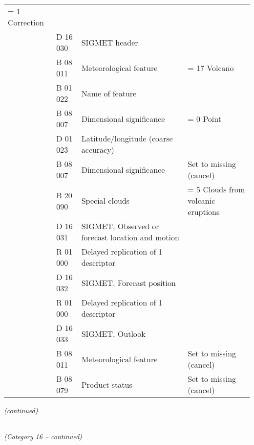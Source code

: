 \begin{longtable}[]{@{}llll@{}}
\begin{minipage}[t]{0.22\columnwidth}
= 1 Correction\strut
\end{minipage}\tabularnewline
& D 16 030 & SIGMET header &\tabularnewline
& B 08 011 & Meteorological feature & = 17 Volcano\tabularnewline
& B 01 022 & Name of feature &\tabularnewline
& B 08 007 & Dimensional significance & = 0 Point\tabularnewline
& D 01 023 & Latitude/longitude (coarse accuracy) &\tabularnewline
& B 08 007 & Dimensional significance & Set to missing (cancel)\tabularnewline
& B 20 090 & Special clouds & = 5 Clouds from volcanic eruptions\tabularnewline
& D 16 031 & SIGMET, Observed or forecast location and motion &\tabularnewline
& R 01 000 & Delayed replication of 1 descriptor &\tabularnewline
& D 16 032 & SIGMET, Forecast position &\tabularnewline
& R 01 000 & Delayed replication of 1 descriptor &\tabularnewline
& D 16 033 & SIGMET, Outlook &\tabularnewline
& B 08 011 & Meteorological feature & Set to missing (cancel)\tabularnewline
& B 08 079 & Product status & Set to missing (cancel)\tabularnewline
\bottomrule
\end{longtable}

\emph{(continued)}

\emph{\\
(Category 16 -- continued)}

